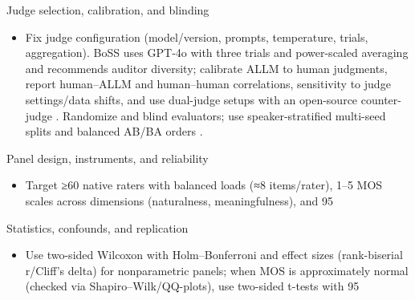 \documentclass{article}
\begin{document}
Judge selection, calibration, and blinding
\begin{itemize}
  \item Fix judge configuration (model/version, prompts, temperature, trials, aggregation). BoSS uses GPT‑4o with three trials and power-scaled averaging and recommends auditor diversity; calibrate ALLM to human judgments, report human–ALLM and human–human correlations, sensitivity to judge settings/data shifts, and use dual-judge setups with an open-source counter-judge \cite{wang2025bossbeyondsemanticspeech}. Randomize and blind evaluators; use speaker-stratified multi-seed splits and balanced AB/BA orders \cite{vashishth2024stabspeechtokenizerassessmentbenchmark,chen2023reducingbarriersselfsupervisedlearninghu}.
\end{itemize}

Panel design, instruments, and reliability
\begin{itemize}
  \item Target ≥60 native raters with balanced loads (≈8 items/rater), 1–5 MOS scales across dimensions (naturalness, meaningfulness), and 95%
\end{itemize}

Statistics, confounds, and replication
\begin{itemize}
  \item Use two-sided Wilcoxon with Holm–Bonferroni and effect sizes (rank-biserial r/Cliff’s delta) for nonparametric panels; when MOS is approximately normal (checked via Shapiro–Wilk/QQ-plots), use two-sided t-tests with 95%
\end{itemize}
\end{document}
